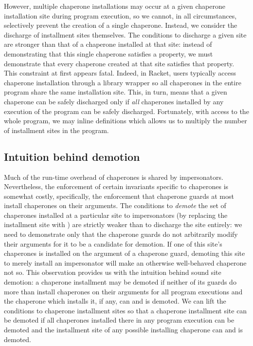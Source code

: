 \documentclass{sigplanconf}
\begin{document}
However, multiple chaperone installations may occur at a given chaperone installation site during program execution, so we cannot, in all circumstances, selectively prevent the creation of a single chaperone.
Instead, we consider the discharge of installment sites themselves.
The conditions to discharge a given site are stronger than that of a chaperone installed at that site: instead of demonstrating that this single chaperone satisfies a property, we must demonstrate that every chaperone created at that site satisfies that property.
This constraint at first appears fatal.
Indeed, in Racket, users typically access chaperone installation through a library wrapper so all chaperones in the entire program share the same installation site.
This, in turn, means that a given chaperone can be safely discharged only if \emph{all} chaperones installed by any execution of the program can be safely discharged.
Fortunately, with access to the whole program, we may inline definitions which allows us to multiply the number of installment sites in the program.


\subsection{Intuition behind demotion}

Much of the run-time overhead of chaperones is shared by impersonators.
Nevertheless, the enforcement of certain invariants specific to chaperones is somewhat costly, specifically, the enforcement that chaperone guards at most install chaperones on their arguments.
The conditions to \emph{demote} the set of chaperones installed at a particular site to impersonators (by replacing the  installment site with ) are strictly weaker than to discharge the site entirely: we need to demonstrate only that the chaperone guards do not arbitrarily modify their arguments for it to be a candidate for demotion.
If one of this site's chaperones is installed on the argument of a chaperone guard, demoting this site to merely install an impersonator will make an otherwise well-behaved chaperone not so.
This observation provides us with the intuition behind sound site demotion: a chaperone installment may be demoted if neither of its guards do more than install chaperones on their arguments for all program executions and the chaperone which installs it, if any, can and is demoted. 
We can lift the conditions to chaperone installment sites so that a chaperone installment site can be demoted if all chaperones installed there in any program execution can be demoted and the installment site of any possible installing chaperone can and is demoted.
\end{document}
